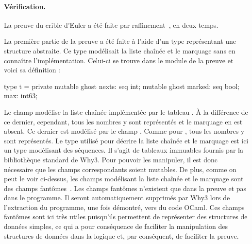 \documentclass[a4paper]{easychair}
\begin{document}
\paragraph{Vérification.}



La preuve du crible d'Euler a été faite par raffinement~\cite{paskevich20isola},
en deux temps.

La première partie de la preuve a été faite à l'aide d'un type 
représentant une structure abstraite.
Ce type modélisait la liste chaînée et le marquage sans en connaître
l'implémentation. Celui-ci se trouve dans le module 
de la preuve et voici sa définition :
\begin{why3}
type t = private {
  mutable ghost nexts: seq int;
  mutable ghost marked: seq bool;
  max: int63;
}
\end{why3}
Le champ  modélise la liste chaînée implémentée par le
tableau . À la différence de ce dernier, cependant, tous les
nombres y sont représentés et le marquage en est absent.
Ce dernier est modélisé par le champ . Comme pour ,
tous les nombres y sont représentés.
Le type  utilisé pour décrire la liste chaînée et le marquage
est ici un type modélisant des séquences.
Il s'agit de tableaux immuables fournis par la bibliothèque standard
de Why3. Pour pouvoir les manipuler, il est donc nécessaire que les champs
correspondants soient mutables.
De plus, comme on peut le voir ci-dessus, les champs modélisant la liste chaînée
et le marquage sont des champs fantômes~\cite{ghost-code}.
Les champs fantômes n'existent que dans la preuve et pas dans
le programme. Il seront automatiquement supprimés par Why3 lors
de l'extraction du programme, une fois démontré, vers du code OCaml.
Ces champs fantômes sont ici très utiles puisqu'ils permettent de représenter
des structures de données simples, ce qui a pour conséquence de faciliter
la manipulation des structures de données dans la logique et, par conséquent,
de faciliter la preuve.
\end{document}

